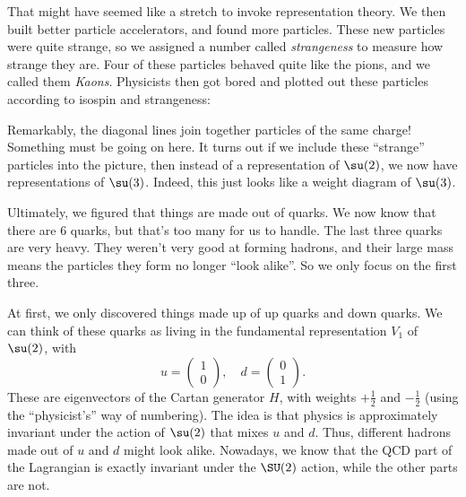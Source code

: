 \documentclass[a4paper]{article}
\begin{document}
That might have seemed like a stretch to invoke representation theory. We then built better particle accelerators, and found more particles. These new particles were quite strange, so we assigned a number called \emph{strangeness} to measure how strange they are. Four of these particles behaved quite like the pions, and we called them \emph{Kaons}. Physicists then got bored and plotted out these particles according to isospin and strangeness:
\begin{center}
\end{center}

Remarkably, the diagonal lines join together particles of the same charge! Something must be going on here. It turns out if we include these ``strange'' particles into the picture, then instead of a representation of $\su(2)$, we now have representations of $\su(3)$. Indeed, this just looks like a weight diagram of $\su(3)$.

Ultimately, we figured that things are made out of quarks. We now know that there are $6$ quarks, but that's too many for us to handle. The last three quarks are very heavy. They weren't very good at forming hadrons, and their large mass means the particles they form no longer ``look alike''. So we only focus on the first three.

At first, we only discovered things made up of up quarks and down quarks. We can think of these quarks as living in the fundamental representation $V_1$ of $\su(2)$, with
\[
  u =
  \begin{pmatrix}
    1 \\ 0
  \end{pmatrix},\quad
  d =
  \begin{pmatrix}
    0 \\ 1
  \end{pmatrix}.
\]
These are eigenvectors of the Cartan generator $H$, with weights $+\frac{1}{2}$ and $-\frac{1}{2}$ (using the ``physicist's'' way of numbering). The idea is that physics is approximately invariant under the action of $\su(2)$ that mixes $u$ and $d$. Thus, different hadrons made out of $u$ and $d$ might look alike. Nowadays, we know that the QCD part of the Lagrangian is exactly invariant under the $\SU(2)$ action, while the other parts are not.
\end{document}

